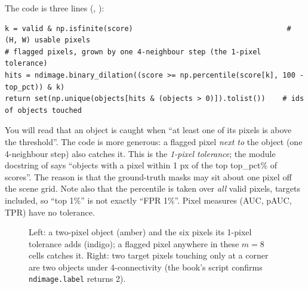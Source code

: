 The code is three lines (, ):
\begin{lstlisting}[basicstyle=\ttfamily\footnotesize]
k = valid & np.isfinite(score)                                    # (H, W) usable pixels
# flagged pixels, grown by one 4-neighbour step (the 1-pixel tolerance)
hits = ndimage.binary_dilation((score >= np.percentile(score[k], 100 - top_pct)) & k)
return set(np.unique(objects[hits & (objects > 0)]).tolist())    # ids of objects touched
\end{lstlisting}

\begin{sourcenote}
You will read that an object is caught when ``at least one of its pixels is above the threshold''. The code is
more generous: a flagged pixel \emph{next to} the object (one 4-neighbour step) also catches it. This is the
\emph{1-pixel tolerance}; the module docstring of  says
``objects with a pixel within 1 px of the top top\_pct\% of scores''. The reason is that the ground-truth masks may
sit about one pixel off the scene grid. Note also that the percentile is taken over \emph{all} valid pixels, targets
included, so ``top 1\%'' is not exactly ``FPR 1\%''. Pixel measures (AUC, pAUC, TPR) have no tolerance.
\end{sourcenote}

\begin{figure}[htbp]
\centering
{}
\caption{Left: a two-pixel object (amber) and the six pixels its 1-pixel tolerance adds (indigo); a flagged pixel
anywhere in these $m = 8$ cells catches it. Right: two target pixels touching only at a corner are two objects under
4-connectivity (the book's script confirms \texttt{ndimage.label} returns 2).}
\label{fig:measures:dilate}
\end{figure}

